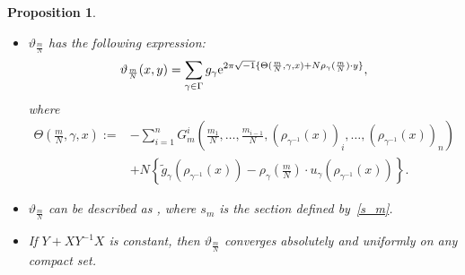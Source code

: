 \documentclass[pdftex]{sigma}
\numberwithin{equation}{section}
\newtheorem{Proposition}[Theorem]{Proposition}
 { \theoremstyle{definition}
\newtheorem{Definition}[Theorem]{Definition}
\newtheorem{Note}[Theorem]{Note}
\newtheorem{Example}[Theorem]{Example}
\newtheorem{Remark}[Theorem]{Remark} }
\renewcommand{\tilde}{\widetilde}
\newcommand{\vardbtilde}[1]{\tilde{\raisebox{0pt}[0.85\height]{$\tilde{#1}$}}}
\begin{document}
\begin{Proposition}\label{expression of theta}\quad
\begin{itemize}\itemsep=0pt
\item[$(1)$] $\vartheta_{\frac{m}{N}}$ has the following expression:
\begin{align*}%
\vartheta_{\frac{m}{N}}(x,y)
=\sum_{\gamma \in \Gamma}g_\gamma {\rm e}^{2\pi\sqrt{-1}\{\Theta (\frac{m}{N}, \gamma, x)+N\rho_\gamma (\frac{m}{N})\cdot y\}},
\end{align*}
where
\begin{align*}
\Theta \left(\frac{m}{N}, \gamma, x\right):={}&-\sum_{i=1}^nG_m^i\left(\frac{m_1}{N},\ldots ,\frac{m_{i-1}}{N},(\rho_{\gamma^{-1}}(x))_i,\ldots ,(\rho_{\gamma^{-1}}(x))_n\right)\\
&+N\left\{{\tilde g}_\gamma (\rho_{\gamma^{-1}}(x))-\rho_\gamma \left(\frac{m}{N}\right)\cdot u_\gamma (\rho_{\gamma^{-1}}(x))\right\}.
\end{align*}
\item[$(2)$] $\vartheta_{\frac{m}{N}}$ can be described as \smash{$\vartheta_{\frac{m}{N}}\!=\!\sum_{\gamma \in \Gamma}{\vardbtilde \rho}_\gamma \circ s_m\circ {\tilde \rho}_{\gamma^{-1}}$}, where $s_m$ is the section defined by~\eqref{s_m}.
\item[$(3)$] If $Y+XY^{-1}X$ is constant, then $\vartheta_{\frac{m}{N}}$ converges absolutely and uniformly on any compact set.
\end{itemize}
\end{Proposition}
\end{document}
